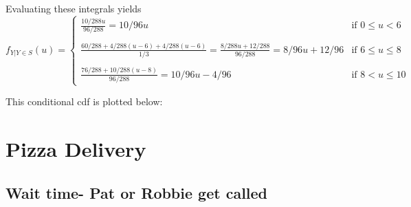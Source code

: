 \documentclass[paper=a4, fontsize=11pt]{scrartcl} %
\numberwithin{equation}{section} %
\numberwithin{figure}{section} %
\numberwithin{table}{section} %
\begin{document}
Evaluating these integrals yields
\[ 
f_{Y | {Y \in S}} (u) = 
	\begin{cases}
		\frac{10/288 u}{96/288} = 10/96 u & \textrm{if } 0 \leq u <6 \\
		\\
		\frac{60/288 + 4/288(u-6) + 4/288(u-6)}{1/3} = 
		\frac{8/288 u +12/288}{96/288} = 8/96 u + 12/ 96 & \textrm{if } 6 \leq u \leq 8\\
		\\
		\frac{76/288 + 10/288(u-8)}{96/288}  = 10/96 u - 4/96 & \textrm{if } 8 < u \leq 10
	\end{cases}
\]

This conditional cdf is plotted below:

\begin{center}
\end{center}


\section{Pizza Delivery}

\subsection{Wait time- Pat or Robbie get called}
\end{document}
